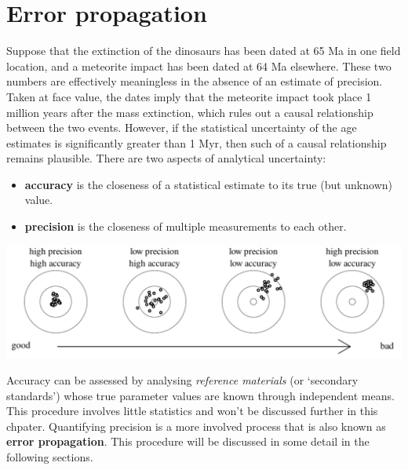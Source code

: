 \chapter{Error propagation}
\label{ch:errorprop}

Suppose that the extinction of the dinosaurs has been dated at 65 Ma
in one field location, and a meteorite impact has been dated at 64 Ma
elsewhere.  These two numbers are effectively meaningless in the
absence of an estimate of precision. Taken at face value, the dates
imply that the meteorite impact took place 1 million years after the
mass extinction, which rules out a causal relationship between the two
events. However, if the statistical uncertainty of the age estimates
is significantly greater than 1 Myr, then such of a causal
relationship remains plausible. There are two aspects of analytical
uncertainty:

\begin{itemize}
  \item{\bf accuracy} is the closeness of a statistical estimate to
    its true (but unknown) value.
  \item{\bf precision} is the closeness of multiple measurements to
    each other.
\end{itemize}

\noindent\includegraphics[width=\textwidth]{../figures/accuracyvsprecision.pdf}
\begingroup {}
\label{fig:darts}
\endgroup

Accuracy can be assessed by analysing \emph{reference materials} (or
`secondary standards') whose true parameter values are known through
independent means. This procedure involves little statistics and won't
be discussed further in this chpater. Quantifying precision is a more
involved process that is also known as \textbf{error
  propagation}. This procedure will be discussed in some detail in the
following sections.

